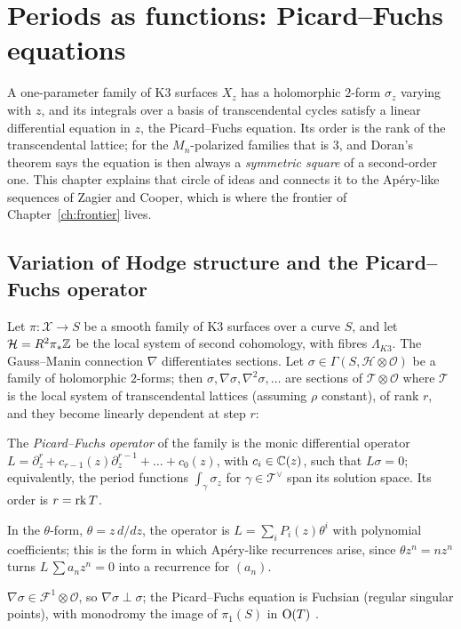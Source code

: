 \chapter{Periods as functions: Picard--Fuchs equations}\label{ch:pf}

A one-parameter family of K3 surfaces $X_z$ has a holomorphic $2$-form
$\sigma_z$ varying with $z$, and its integrals over a basis of transcendental
cycles satisfy a linear differential equation in $z$, the Picard--Fuchs
equation. Its order is the rank of the transcendental lattice; for the
$M_n$-polarized families that is $3$, and Doran's theorem says the equation is
then always a \emph{symmetric square} of a second-order one. This chapter
explains that circle of ideas and connects it to the Ap\'ery-like sequences
of Zagier and Cooper, which is where the frontier of Chapter~\ref{ch:frontier}
lives.

\section{Variation of Hodge structure and the Picard--Fuchs operator}

Let $\pi\colon\mathcal X\to S$ be a smooth family of K3 surfaces over a curve
$S$, and let $\mathcal H=R^2\pi_*\mathbb{Z}$ be the local system of second cohomology,
with fibres $\Lambda_{K3}$. The Gauss--Manin connection $\nabla$ differentiates
sections. Let $\sigma\in\Gamma(S,\mathcal H\otimes\mathcal O)$ be a family of
holomorphic $2$-forms; then $\sigma,\nabla\sigma,\nabla^2\sigma,\dots$ are
sections of $\mathcal T\otimes\mathcal O$ where $\mathcal T$ is the local
system of transcendental lattices (assuming $\rho$ constant), of rank $r$, and
they become linearly dependent at step $r$:

\begin{definition}
The \emph{Picard--Fuchs operator} of the family is the monic differential
operator $L=\partial_z^r+c_{r-1}(z)\partial_z^{r-1}+\dots+c_0(z)$, with
$c_i\in\mathbb{C}(z)$, such that $L\sigma=0$; equivalently, the period functions
$\int_{\gamma}\sigma_z$ for $\gamma\in\mathcal T^{\vee}$ span its solution
space. Its order is $r=\operatorname{rk} T$.
\end{definition}

In the $\theta$-form, $\theta=z\,d/dz$, the operator is
$L=\sum_i P_i(z)\theta^i$ with polynomial coefficients; this is the form in
which Ap\'ery-like recurrences arise, since $\theta z^n=nz^n$ turns
$L\,\sum a_nz^n=0$ into a recurrence for $(a_n)$.

\begin{theorem}
$\nabla\sigma\in\mathcal F^1\otimes\mathcal O$, so $\nabla\sigma\perp\sigma$;
the Picard--Fuchs equation is Fuchsian (regular singular points), with
monodromy the image of $\pi_1(S)$ in $\operatorname{O}(T)$ \cite[Ch.~10]{Voisin2002}.
\end{theorem}

